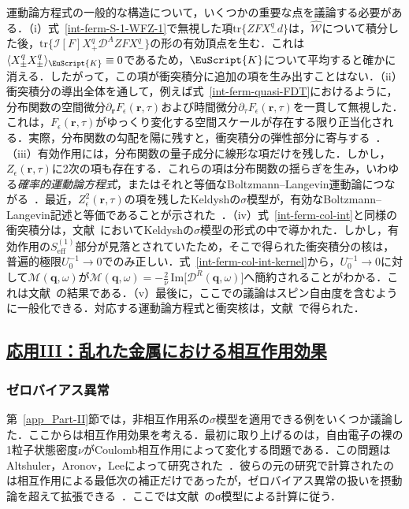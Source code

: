 \documentclass[a4paper,11pt]{ltjsarticle}
\newcommand{\subsectionlink}[1]{\subsection[#1]{\hyperlink{toc}{#1}}}
\def\tr{\mathrm{tr}}
\def\qo{(\mathbf{q},\omega)}
\begin{document}
運動論方程式の一般的な構造について，いくつかの重要な点を議論する必要がある．（i）式~\eqref{int-ferm-S-1-WFZ-1}で無視した項$\tr\{ZFX^{q}_{-}d\}$は，$\hat{\mathcal{W}}$について積分した後，$\tr\big\{\mathcal{I}[F]X^{q}_{+}\mathcal{D}^{A}ZFX^{q}_{-}\big\}$の形の有効頂点を生む．これは$\langle
X^{q}_{\pm}X^{q}_{\pm}\rangle_{\EuScript{K}}\equiv0$であるため，$\EuScript{K}$について平均すると確かに消える．したがって，この項が衝突積分に追加の項を生み出すことはない．（ii）衝突積分の導出全体を通して，例えば式~\eqref{int-ferm-quasi-FDT}におけるように，分布関数の空間微分$\partial_{\mathbf{r}}
F_{\epsilon}(\mathbf{r},\tau)$および時間微分$\partial_{\tau}F_{\epsilon}(\mathbf{r},\tau)$を一貫して無視した．これは，$F_{\epsilon}(\mathbf{r},\tau)$がゆっくり変化する空間スケールが存在する限り正当化される．実際，分布関数の勾配を陽に残すと，衝突積分の弾性部分に寄与する~\cite{Zala,CatelaniAleiner}．（iii）有効作用には，分布関数の量子成分に線形な項だけを残した．しかし，$Z_{\epsilon}(\mathbf{r},\tau)$に2次の項も存在する．これらの項は分布関数の揺らぎを生み，いわゆる\textit{確率的運動論方程式}，またはそれと等価なBoltzmann--Langevin運動論につながる~\cite{Kogan,KoganShulman,Nagaev}．最近，$Z^{2}_{\epsilon}(\mathbf{r},\tau)$の項を残したKeldyshの$\sigma$模型が，有効なBoltzmann--Langevin記述と等価であることが示された~\cite{Gutman,Bagrets}．（iv）式~\eqref{int-ferm-col-int}と同様の衝突積分は，文献~\cite{KamenevAndreev}においてKeldyshの$\sigma$模型の形式の中で導かれた．しかし，有効作用の$S^{(1)}_{\mathrm{eff}}$部分が見落とされていたため，そこで得られた衝突積分の核は，普遍的極限$U^{-1}_{0}\to0$でのみ正しい．式~\eqref{int-ferm-col-int-kernel}から，$U^{-1}_{0}\to0$に対して$\mathcal{M}\qo$が$\mathcal{M}\qo=-\frac{2}{\nu}\,\mathrm{Im}\big[\mathcal{D}^{R}\qo\big]$へ簡約されることがわかる．これは文献~\cite{KamenevAndreev}の結果である．（v）最後に，ここでの議論はスピン自由度を含むように一般化できる．対応する運動論方程式と衝突核は，文献~\cite{DimitrovaKtavtsov,BurmiChelk}で得られた．

\subsectionlink{応用III：乱れた金属における相互作用効果}\label{app_Part-III}
\subsubsection{ゼロバイアス異常}\label{app_Part-III-1}

第~\ref{app_Part-II}節では，非相互作用系の$\sigma$模型を適用できる例をいくつか議論した．ここからは相互作用効果を考える．最初に取り上げるのは，自由電子の裸の1粒子状態密度$\nu$がCoulomb相互作用によって変化する問題である．この問題はAltshuler，Aronov，Leeによって研究された~\cite{AltshulerAronov,AAL,AltshulerAronov-review}．彼らの元の研究で計算されたのは相互作用による最低次の補正だけであったが，ゼロバイアス異常の扱いを摂動論を超えて拡張できる~\cite{Finkel'stein,Nazarov-ZBA,LevitovShytov,Kopietz}．ここでは文献~\cite{KamenevAndreev}のσ模型による計算に従う．
\end{document}
